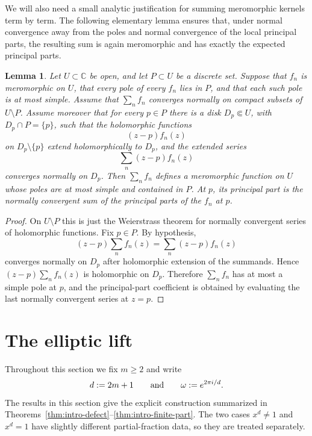 \documentclass[12pt]{amsart}
\numberwithin{equation}{section}
\newtheorem{lemma}[theorem]{Lemma}
\begin{document}
We will also need a small analytic justification for summing meromorphic
kernels term by term.  The following elementary lemma ensures that, under normal
convergence away from the poles and normal convergence of the local principal
parts, the resulting sum is again meromorphic and has exactly the expected
principal parts.

\begin{lemma}%
\label{lem:normal-simple-poles}
Let \(U\subset\mathbb C\) be open, and let \(P\subset U\) be a discrete set.
Suppose that \(f_n\) is meromorphic on \(U\), that every pole of every \(f_n\) lies in \(P\), and that each such pole is at most simple.  Assume that
\(\sum_n f_n\) converges normally on compact subsets of \(U\setminus P\).
Assume moreover that for every \(p\in P\) there is a disk \(D_p\Subset U\), with
\(D_p\cap P=\{p\}\), such that the holomorphic functions
\[
        (z-p)f_n(z)
\]
on \(D_p\setminus\{p\}\) extend holomorphically to \(D_p\), and the extended
series
\[
        \sum_n (z-p)f_n(z)
\]
converges normally on \(D_p\).  Then \(\sum_n f_n\) defines a meromorphic
function on \(U\) whose poles are at most simple and contained in \(P\).  At
\(p\), its principal part is the normally convergent sum of the principal parts
of the \(f_n\) at \(p\).
\end{lemma}

\begin{proof}
On \(U\setminus P\) this is just the Weierstrass theorem for normally
convergent series of holomorphic functions.  Fix \(p\in P\).  By hypothesis,
\[
        (z-p)\sum_n f_n(z)=\sum_n (z-p)f_n(z)
\]
converges normally on \(D_p\) after holomorphic extension of the summands.
Hence \((z-p)\sum_n f_n(z)\) is holomorphic on \(D_p\).  Therefore
\(\sum_n f_n\) has at most a simple pole at \(p\), and the principal-part
coefficient is obtained by evaluating the last normally convergent series at
\(z=p\).
\end{proof}

\section{The elliptic lift}\label{sec:corrected-lift}

Throughout this section we fix $m\geq 2$ and write
\[
d:=2m+1
\qquad {\text {\rm and}}\qquad
\omega:=e^{2\pi i/d}.
\]
The results in this section give the explicit construction summarized in
Theorems~\ref{thm:intro-defect}--\ref{thm:intro-finite-part}.  The two cases \(x^d\neq1\) and
\(x^d=1\) have slightly different partial-fraction data, so they are treated
separately.
\end{document}
